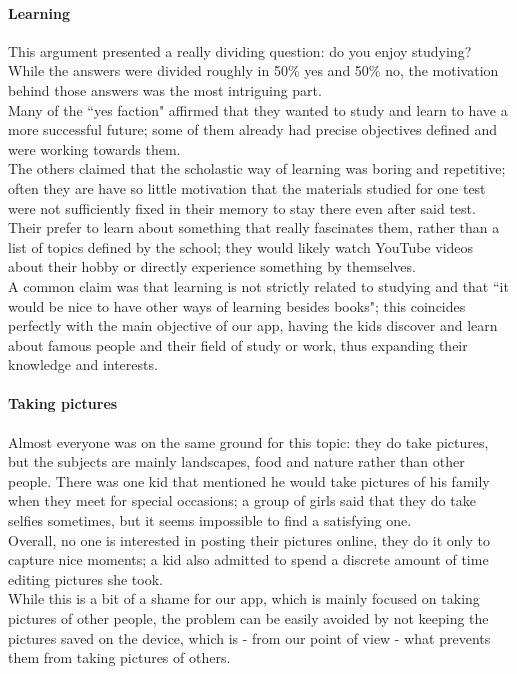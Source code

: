 \documentclass[12pt]{scrartcl}
\begin{document}
		\paragraph{Learning} This argument presented a really dividing question: do you enjoy studying? While the answers were divided roughly in 50\% yes and 50\% no, the motivation behind those answers was the most intriguing part.\\
		Many of the ``yes faction" affirmed that they wanted to study and learn to have a more successful future; some of them already had precise objectives defined and were working towards them.\\
		The others claimed that the scholastic way of learning was boring and repetitive; often they are have so little motivation that the materials studied for one test were not sufficiently fixed in their memory to stay there even after said test. Their prefer to learn about something that really fascinates them, rather than a list of topics defined by the school; they would likely watch YouTube videos about their hobby or directly experience something by themselves.\\
		A common claim was that learning is not strictly related to studying and that ``it would be nice to have other ways of learning besides books"; this coincides perfectly with the main objective of our app, having the kids discover and learn about famous people and their field of study or work, thus expanding their knowledge and interests.
		
		\paragraph{Taking pictures} Almost everyone was on the same ground for this topic: they do take pictures, but the subjects are mainly landscapes, food and nature rather than other people. There was one kid that mentioned he would take pictures of his family when they meet for special occasions; a group of girls said that they do take selfies sometimes, but it seems impossible to find a satisfying one.\\
		Overall, no one is interested in posting their pictures online, they do it only to capture nice moments; a kid also admitted to spend a discrete amount of time editing pictures she took.\\
		While this is a bit of a shame for our app, which is mainly focused on taking pictures of other people, the problem can be easily avoided by not keeping the pictures saved on the device, which is - from our point of view - what prevents them from taking pictures of others.
		
\end{document}
